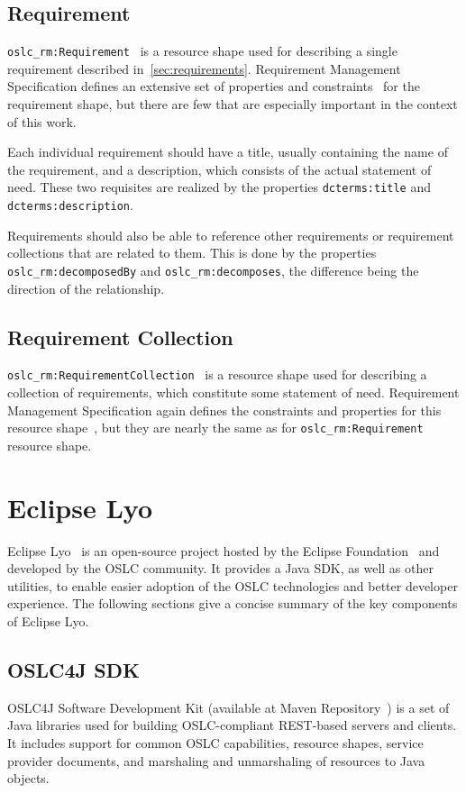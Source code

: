 \subsection*{Requirement}
\texttt{oslc\_rm:Requirement} \cite{oslc_rm_requirement} is a resource shape used for describing a single requirement described in \ref{sec:requirements}. Requirement Management Specification defines an extensive set of properties and constraints \cite{oslc_rm_requirement_constraints} for the requirement shape, but there are few that are especially important in the context of this work.

Each individual requirement should have a title, usually containing the name of the requirement, and a description, which consists of the actual statement of need. These two requisites are realized by the properties \texttt{dcterms:title} and \texttt{dcterms:description}.

Requirements should also be able to reference other requirements or requirement collections that are related to them. This is done by the properties \texttt{oslc\_rm:decomposedBy} and \texttt{oslc\_rm:decomposes}, the difference being the direction of the relationship.

\subsection*{Requirement Collection}
\texttt{oslc\_rm:RequirementCollection} \cite{oslc_rm_requirement_collection} is a resource shape used for describing a collection of requirements, which constitute some statement of need. Requirement Management Specification again defines the constraints and properties for this resource shape \cite{oslc_rm_requirement_collection_constraints}, but they are nearly the same as for \texttt{oslc\_rm:Requirement} resource shape.

\section{Eclipse Lyo}
Eclipse Lyo \cite{eclipse_lyo} is an open-source project hosted by the Eclipse Foundation \cite{eclipse} and developed by the OSLC community. It provides a Java SDK, as well as other utilities, to enable easier adoption of the OSLC technologies and better developer experience. The following sections give a concise summary of the key components of Eclipse Lyo.

\subsection*{OSLC4J SDK}
OSLC4J Software Development Kit (available at Maven Repository \cite{maven_oslc4j}) is a set of Java libraries used for building OSLC-compliant REST-based servers and clients. It includes support for common OSLC capabilities, resource shapes, service provider documents, and marshaling and unmarshaling of resources to Java objects. 

